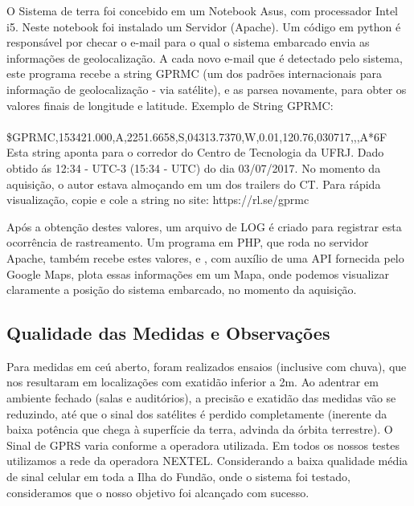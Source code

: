 \hspace{0.5cm} O Sistema de terra foi concebido em um Notebook Asus, com processador Intel i5. Neste notebook foi instalado um Servidor (Apache). Um código em python é responsável por checar o e-mail para o qual o sistema embarcado envia as informações de geolocalização. A cada novo e-mail que é detectado pelo sistema, este programa recebe a string GPRMC (um dos padrões internacionais para informação de geolocalização - via satélite), e as parsea novamente, para obter os valores finais de longitude e latitude. Exemplo de String GPRMC: \\ \\ \$GPRMC,153421.000,A,2251.6658,S,04313.7370,W,0.01,120.76,030717,,,A*6F \\

Esta string aponta para o corredor do Centro de Tecnologia da UFRJ. Dado obtido ás 12:34 - UTC-3 (15:34 - UTC) do dia 03/07/2017. No momento da aquisição, o autor estava almoçando em um dos trailers do CT. Para rápida visualização, copie e cole a string no site: https://rl.se/gprmc

Após a obtenção destes valores, um arquivo de LOG é criado para registrar esta ocorrência de rastreamento. Um programa em PHP, que roda no servidor Apache, também recebe estes valores, e , com auxílio de uma API fornecida pelo Google Maps, plota essas informações em um Mapa, onde podemos visualizar claramente a posição do sistema embarcado, no momento da aquisição.

\subsection{Qualidade das Medidas e Observações}
\hspace{0.5cm} Para medidas em ceú aberto, foram realizados ensaios (inclusive com chuva), que nos resultaram em localizações com exatidão inferior a 2m. Ao adentrar em ambiente fechado (salas e auditórios), a precisão e exatidão das medidas vão se reduzindo, até que o sinal dos satélites é perdido completamente (inerente da baixa potência que chega à superfície da terra, advinda da órbita terrestre). O Sinal de GPRS varia conforme a operadora utilizada. Em todos os nossos testes utilizamos a rede da operadora NEXTEL. Considerando a baixa qualidade média de sinal celular em toda a Ilha do Fundão, onde o sistema foi testado, consideramos que o nosso objetivo foi alcançado com sucesso.

